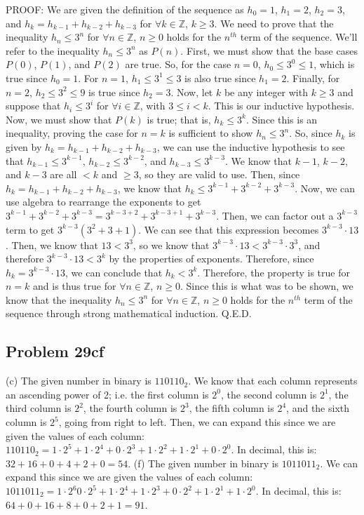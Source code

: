 \documentclass{article}
\begin{document}
PROOF: We are given the definition of the sequence as $h_{0}=1$, $h_{1}=2$, $h_{2}=3$, and $h_{k}=h_{k-1} + h_{k-2} + h_{k-3}$ for $\forall k \in \mathbb{Z}$, $k \geq 3$. We need to prove that the inequality $h_{n} \leq 3^{n}$ for $\forall n \in \mathbb{Z}$, $n \geq 0$ holds for the $n^{th}$ term of the sequence. We'll refer to the inequality $h_{n} \leq 3^{n}$ as $P(n)$. First, we must show that the base cases $P(0)$, $P(1)$, and $P(2)$ are true. So, for the case $n=0$, $h_{0} \leq 3^{0} \leq 1$, which is true since $h_{0}=1$. For $n=1$, $h_{1} \leq 3^{1} \leq 3$ is also true since $h_{1}=2$. Finally, for $n=2$, $h_{2} \leq 3^{2} \leq 9$ is true since $h_{2}=3$. Now, let $k$ be any integer with $k \geq 3$ and suppose that $h_{i} \leq 3^{i}$ for $\forall i \in \mathbb{Z}$, with $3 \leq i < k$. This is our inductive hypothesis. Now, we must show that $P(k)$ is true; that is, $h_{k} \leq 3^{k}$. Since this is an inequality, proving the case for $n=k$ is sufficient to show $h_{n} \leq 3^{n}$. So, since $h_{k}$ is given by $h_{k}=h_{k-1} + h_{k-2} + h_{k-3}$, we can use the inductive hypothesis to see that $h_{k-1} \leq 3^{k-1}$, $h_{k-2} \leq 3^{k-2}$, and $h_{k-3} \leq 3^{k-3}$. We know that $k-1$, $k-2$, and $k-3$ are all $< k$ and $\geq 3$, so they are valid to use. Then, since $h_{k}=h_{k-1} + h_{k-2} + h_{k-3}$, we know that $h_{k} \leq 3^{k-1} + 3^{k-2} + 3^{k-3}$. Now, we can use algebra to rearrange the exponents to get $3^{k-1} + 3^{k-2} + 3^{k-3} = 3^{k-3+2} + 3^{k-3+1} + 3^{k-3}$. Then, we can factor out a $3^{k-3}$ term to get $3^{k-3}(3^{2}+3+1)$. We can see that this expression becomes $3^{k-3}\cdot13$. Then, we know that $13<3^{3}$, so we know that  $3^{k-3}\cdot13 < 3^{k-3}\cdot3^{3}$, and therefore $3^{k-3}\cdot13 < 3^{k}$ by the properties of exponents. Therefore, since $h_{k} = 3^{k-3}\cdot13$, we can conclude that $h_{k} < 3^{k}$. Therefore, the property is true for $n=k$ and is thus true for $\forall n \in \mathbb{Z}$, $n \geq 0$. Since this is what was to be shown, we know that the inequality $h_{n} \leq 3^{n}$ for $\forall n \in \mathbb{Z}$, $n \geq 0$ holds for the $n^{th}$ term of the sequence through strong mathematical induction. Q.E.D.

\subsection*{Problem 29cf}

(c) The given number in binary is $110110_{2}$. We know that each column represents an ascending power of 2; i.e. the first column is $2^0$, the second column is $2^1$, the third column is $2^2$, the fourth column is $2^3$, the fifth column is $2^4$, and the sixth column is $2^5$, going from right to left. Then, we can expand this since we are given the values of each column: $110110_{2} = 1 \cdot 2^{5} +1 \cdot 2^{4} + 0 \cdot 2^{3} + 1 \cdot 2^{2} + 1 \cdot 2^{1} + 0 \cdot 2^{0}$. In decimal, this is: $32+16+0+4+2+0 = 54$.\vspace{5mm} \hfill \break (f) The given number in binary is $1011011_{2}$. We can expand this since we are given the values of each column: $1011011_{2} = 1 \cdot 2^{6} 0 \cdot 2^{5} +1 \cdot 2^{4} + 1 \cdot 2^{3} + 0 \cdot 2^{2} + 1 \cdot 2^{1} + 1 \cdot 2^{0}$. In decimal, this is: $64+0+16+8+0+2+1 = 91$.
\end{document}
